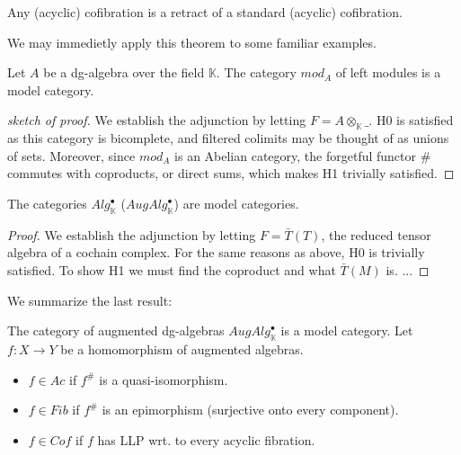 \documentclass[../thesis.tex]{subfiles}
\begin{document}
            \begin{corollary}
                Any (acyclic) cofibration is a retract of a standard (acyclic) cofibration.
            \end{corollary}

            We may immedietly apply this theorem to some familiar examples.

            \begin{corollary}
                Let $A$ be a dg-algebra over the field $\mathbb{K}$. The category $mod_A$ of left modules is a model category.
            \end{corollary}

            \begin{proof}[sketch of proof]
                We establish the adjunction by letting $F = A\otimes_\mathbb{K}\_$. H0 is satisfied as this category is bicomplete, and filtered colimits may be thought of as unions of sets. Moreover, since $mod_A$ is an Abelian category, the forgetful functor $\#$ commutes with coproducts, or direct sums, which makes H1 trivially satisfied.
            \end{proof}

            \begin{corollary}
                The categories $Alg^\bullet_\mathbb{K}$ ($AugAlg^\bullet_\mathbb{K}$) are model categories.
            \end{corollary}

            \begin{proof}
                We establish the adjunction by letting $F = \bar{T} (T)$, the reduced tensor algebra of a cochain complex. For the same reasons as above, H0 is trivially satisfied. To show H1 we must find the coproduct and what $\bar{T}(M)$ is. ...
            \end{proof}

            We summarize the last result:

            The category of augmented dg-algebras $AugAlg^\bullet_\mathbb{K}$ is a model category. Let $f:X\rightarrow Y$ be a homomorphism of augmented algebras. 
            \begin{itemize}
                \item $f\in Ac$ if $f^\#$ is a quasi-isomorphism.
                \item $f\in Fib$ if $f^\#$ is an epimorphism (surjective onto every component).
                \item $f\in Cof$ if $f$ has LLP wrt. to every acyclic fibration.
            \end{itemize}
            
\end{document}
